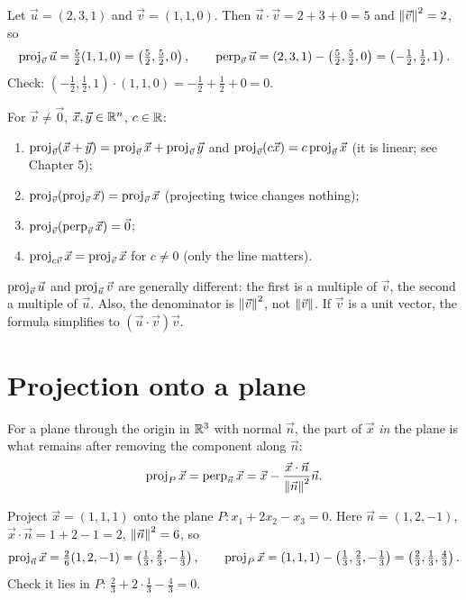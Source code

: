 \begin{example}
Let $\vec u=(2,3,1)$ and $\vec v=(1,1,0)$. Then $\vec u\cdot\vec v = 2+3+0=5$ and
$\left\lVert \vec v \right\rVert^2=2$, so
\[
  \operatorname{proj}_{\vec v}\vec u = \tfrac52(1,1,0) = \left(\tfrac52,\tfrac52,0\right),\qquad
  \operatorname{perp}_{\vec v}\vec u = (2,3,1)-\left(\tfrac52,\tfrac52,0\right) = \left(-\tfrac12,\tfrac12,1\right).
\]
Check: $\left(-\frac12,\frac12,1\right)\cdot(1,1,0) = -\frac12+\frac12+0 = 0$.
\end{example}

\begin{theorem}
For $\vec v\ne\vec0$, $\vec x,\vec y\in\mathbb{R}^n$, $c\in\mathbb{R}$:
\begin{enumerate}
  \item $\operatorname{proj}_{\vec v}(\vec x+\vec y)=\operatorname{proj}_{\vec v}\vec x+\operatorname{proj}_{\vec v}\vec y$ and
        $\operatorname{proj}_{\vec v}(c\vec x) = c\operatorname{proj}_{\vec v}\vec x$ (it is linear; see Chapter 5);
  \item $\operatorname{proj}_{\vec v}(\operatorname{proj}_{\vec v}\vec x)=\operatorname{proj}_{\vec v}\vec x$ (projecting twice changes nothing);
  \item $\operatorname{proj}_{\vec v}(\operatorname{perp}_{\vec v}\vec x)=\vec 0$;
  \item $\operatorname{proj}_{c\vec v}\vec x = \operatorname{proj}_{\vec v}\vec x$ for $c\ne 0$ (only the line matters).
\end{enumerate}
\end{theorem}

\begin{important}[Pitfall]
$\operatorname{proj}_{\vec v}\vec u$ and $\operatorname{proj}_{\vec u}\vec v$ are generally different: the first is a multiple of
$\vec v$, the second a multiple of $\vec u$. Also, the denominator is $\left\lVert \vec v \right\rVert^2$, not
$\left\lVert \vec v \right\rVert$. If $\vec v$ is a unit vector, the formula simplifies to $(\vec u\cdot\vec v)\vec v$.
\end{important}

\section{Projection onto a plane}

For a plane through the origin in $\mathbb{R}^3$ with normal $\vec n$, the part of $\vec x$ \emph{in} the
plane is what remains after removing the component along $\vec n$:
\[
  \operatorname{proj}_{P}\vec x = \operatorname{perp}_{\vec n}\vec x = \vec x - \frac{\vec x\cdot\vec n}{\left\lVert \vec n \right\rVert^2}\vec n.
\]

\begin{example}
Project $\vec x=(1,1,1)$ onto the plane $P: x_1+2x_2-x_3=0$. Here $\vec n=(1,2,-1)$,
$\vec x\cdot\vec n = 1+2-1 = 2$, $\left\lVert \vec n \right\rVert^2=6$, so
\[
\operatorname{proj}_{\vec n}\vec x=\tfrac{2}{6}(1,2,-1)=\left(\tfrac13,\tfrac23,-\tfrac13\right),\qquad
\operatorname{proj}_P\vec x = (1,1,1)-\left(\tfrac13,\tfrac23,-\tfrac13\right) = \left(\tfrac23,\tfrac13,\tfrac43\right).
\]
Check it lies in $P$: $\frac23+2\cdot\frac13-\frac43=0$.
\end{example}


